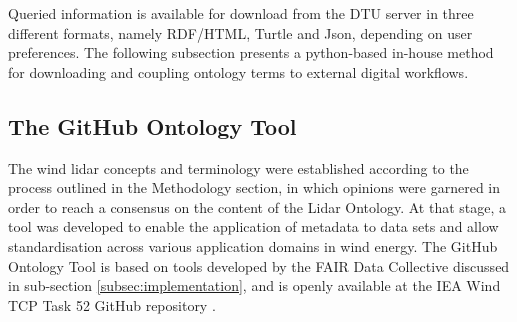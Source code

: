 \documentclass[remotesensing,article,submit,pdftex,moreauthors]{Definitions/mdpi}
\begin{document}
Queried information is available for download from the DTU server in three different formats, namely RDF/HTML, Turtle and Json, depending on user preferences.
The following subsection presents a python-based in-house method for downloading and coupling ontology terms to external digital workflows. 

    




\subsection{The GitHub Ontology Tool}
\label{GitTool}

The wind lidar concepts and terminology were established according to the process outlined in the Methodology section,
in which opinions were garnered in order to reach a consensus on the content of the Lidar Ontology.
At that stage, a tool was developed to enable the application of metadata to data sets and
allow standardisation across various application domains in wind energy.
The GitHub Ontology Tool is based on tools developed by the FAIR Data Collective discussed in sub-section \ref{subsec:implementation}, and is openly available at the IEA Wind TCP Task 52 GitHub repository \cite{IEA_Wind_TCP_Task_52_GitHub_repository}.
\end{document}
